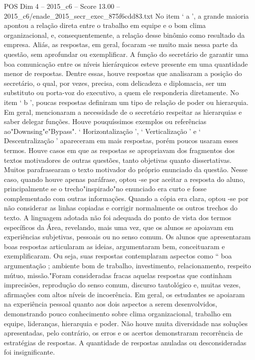 \begin{textsample}{POS Dim 4 – 2015\_c6 – Score 13.00 – 2015\_c6/enade\_2015\_secr\_exec\_875f6cdd83.txt}
No item ‘ a ’, a grande maioria apontou a relação direta entre o trabalho em equipe e o bom clima organizacional, e, consequentemente, a relação desse binômio como resultado da empresa.
Aliás, as respostas, em geral, focaram -se muito mais nessa parte da questão, sem aprofundar ou exemplificar.
A função do secretário de garantir uma boa comunicação entre os níveis hierárquicos esteve presente em uma quantidade menor de respostas.
Dentre essas, houve respostas que analisaram a posição do secretário, o qual, por vezes, precisa, com delicadeza e diplomacia, ser um substituto ou porta-voz do executivo, a quem ele responderia diretamente.
No item ‘ b ’, poucas respostas definiram um tipo de relação de poder ou hierarquia.
Em geral, mencionaram a necessidade de o secretário respeitar as hierarquias e saber delegar funções.
Houve pouquíssimos exemplos ou referências ao"Downsing"e"Bypass". ‘ Horizontalização ’, ‘ Verticalização ’ e ‘ Descentralização ’ apareceram em mais respostas, porém poucos usaram esses termos.
Houve casos em que as respostas se apropriavam dos fragmentos dos textos motivadores de outras questões, tanto objetivas quanto dissertativas.
Muitos parafrasearam o texto motivador do próprio enunciado da questão.
Nesse caso, quando houve apenas paráfrase, optou -se por aceitar a resposta do aluno, principalmente se o trecho"inspirado"no enunciado era curto e fosse complementado com outras informações.
Quando a cópia era clara, optou -se por não considerar as linhas copiadas e corrigir normalmente os outros trechos do texto.
A linguagem adotada não foi adequada do ponto de vista dos termos específicos da Área, revelando, mais uma vez, que os alunos se apoiavam em experiências subjetivas, pessoais ou no senso comum.
Os alunos que apresentaram boas respostas articularam as ideias, argumentaram bem, conceituaram e exemplificaram.
Ou seja, suas respostas contemplaram aspectos como “ boa argumentação ; ambiente bom de trabalho, investimento, relacionamento, respeito mútuo, missão."Foram consideradas fracas aquelas respostas que continham imprecisões, reprodução do senso comum, discurso tautológico e, muitas vezes, afirmações com altos níveis de incoerência.
Em geral, os estudantes se apoiaram na experiência pessoal quanto aos dois aspectos a serem desenvolvidos, demonstrando pouco conhecimento sobre clima organizacional, trabalho em equipe, lideranças, hierarquia e poder.
Não houve muita diversidade nas soluções apresentadas, pelo contrário, os erros e os acertos demonstraram recorrência de estratégias de respostas.
A quantidade de respostas anuladas ou desconsideradas foi insignificante.

\end{textsample}
